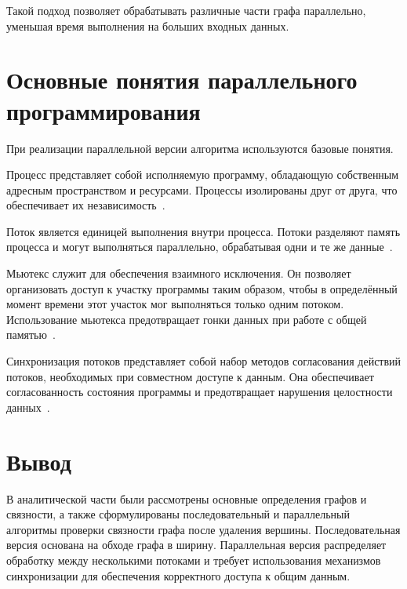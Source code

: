Такой подход позволяет обрабатывать различные части графа параллельно, уменьшая время выполнения на больших входных данных.

\section{Основные понятия параллельного программирования}

При реализации параллельной версии алгоритма используются базовые понятия.

Процесс представляет собой исполняемую программу, обладающую собственным адресным пространством и ресурсами.  
Процессы изолированы друг от друга, что обеспечивает их независимость~\cite{zaharov}.

Поток является единицей выполнения внутри процесса.  
Потоки разделяют память процесса и могут выполняться параллельно, обрабатывая одни и те же данные~\cite{stolyarov,zaharov}.

Мьютекс служит для обеспечения взаимного исключения.  
Он позволяет организовать доступ к участку программы таким образом, чтобы в определённый момент времени этот участок мог выполняться только одним потоком.  
Использование мьютекса предотвращает гонки данных при работе с общей памятью~\cite{stolyarov}.

Синхронизация потоков представляет собой набор методов согласования действий потоков, необходимых при совместном доступе к данным.  
Она обеспечивает согласованность состояния программы и предотвращает нарушения целостности данных~\cite{zaharov}.

\section*{Вывод}

В аналитической части были рассмотрены основные определения графов и связности, а также сформулированы последовательный и параллельный алгоритмы проверки связности графа после удаления вершины.  
Последовательная версия основана на обходе графа в ширину.  
Параллельная версия распределяет обработку между несколькими потоками и требует использования механизмов синхронизации для обеспечения корректного доступа к общим данным.
